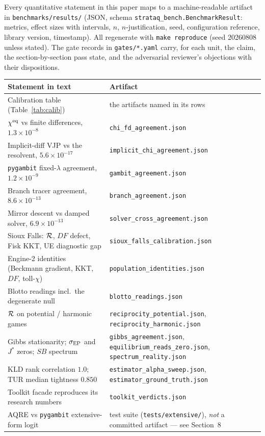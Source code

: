 Every quantitative statement in this paper maps to a machine-readable artifact
in \texttt{benchmarks/\allowbreak results/} (JSON, schema
\texttt{strataq\_bench.BenchmarkResult}: metrics, effect sizes with intervals,
$n$, $n$-justification, seed, configuration reference, library version,
timestamp). All regenerate with \texttt{make reproduce} (seed 20260808 unless
stated). The gate records in \texttt{gates/*.yaml} carry, for each unit, the
claim, the section-by-section pass state, and the adversarial reviewer's
objections with their dispositions.

\begin{center}\footnotesize
\setlength{\tabcolsep}{4pt}
\begin{tabular}{@{}>{\raggedright\arraybackslash}p{6.9cm}>{\raggedright\arraybackslash}p{8.3cm}@{}}
\toprule
Statement in text & Artifact \\
\midrule
Calibration table (Table~\ref{tab:calib}) & the artifacts named in its rows \\
$\chi^{\mathrm{eq}}$ vs finite differences, $1.3\times10^{-8}$ & \texttt{chi\_fd\_agreement.json} \\
Implicit-diff VJP vs the resolvent, $5.6\times10^{-17}$ & \texttt{implicit\_chi\_agreement.json} \\
\texttt{pygambit} fixed-$\lambda$ agreement, $1.2\times10^{-9}$ & \texttt{gambit\_agreement.json} \\
Branch tracer agreement, $8.6\times10^{-13}$ & \texttt{branch\_agreement.json} \\
Mirror descent vs damped solver, $6.9\times10^{-13}$ & \texttt{solver\_cross\_agreement.json} \\
Sioux Falls: $\mathcal{R}$, $DF$ defect, Fisk KKT, UE diagnostic gap & \texttt{sioux\_falls\_calibration.json} \\
Engine-2 identities (Beckmann gradient, KKT, $DF$, toll-$\chi$) & \texttt{population\_identities.json} \\
Blotto readings incl.\ the degenerate null & \texttt{blotto\_readings.json} \\
$\mathcal{R}$ on potential / harmonic games & \texttt{reciprocity\_potential.json}, \texttt{reciprocity\_harmonic.json} \\
Gibbs stationarity; $\sigma_{\mathrm{EP}}$ and $J^*$ zeros; $SB$ spectrum & \texttt{gibbs\_agreement.json}, \texttt{equilibrium\_reads\_zero.json}, \texttt{spectrum\_reality.json} \\
KLD rank correlation $1.0$; TUR median tightness $0.850$ & \texttt{estimator\_alpha\_sweep.json}, \texttt{estimator\_ground\_truth.json} \\
Toolkit facade reproduces its research numbers & \texttt{toolkit\_verdicts.json} \\
AQRE vs \texttt{pygambit} extensive-form logit & test suite (\texttt{tests/extensive/}), \emph{not} a committed artifact --- see Section~8 \\
\bottomrule
\end{tabular}
\end{center}

